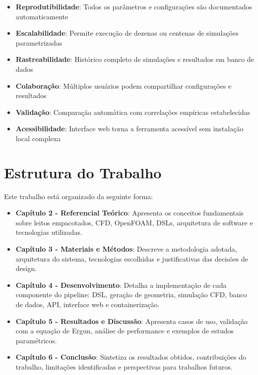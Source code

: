 \begin{itemize}
    \item \textbf{Reprodutibilidade}: Todos os parâmetros e configurações são documentados automaticamente
    \item \textbf{Escalabilidade}: Permite execução de dezenas ou centenas de simulações parametrizadas
    \item \textbf{Rastreabilidade}: Histórico completo de simulações e resultados em banco de dados
    \item \textbf{Colaboração}: Múltiplos usuários podem compartilhar configurações e resultados
    \item \textbf{Validação}: Comparação automática com correlações empíricas estabelecidas
    \item \textbf{Acessibilidade}: Interface web torna a ferramenta acessível sem instalação local complexa
\end{itemize}

\section{Estrutura do Trabalho}

Este trabalho está organizado da seguinte forma:

\begin{itemize}
    \item \textbf{Capítulo 2 - Referencial Teórico}: Apresenta os conceitos fundamentais sobre leitos empacotados, CFD, OpenFOAM, DSLs, arquitetura de software e tecnologias utilizadas.
    
    \item \textbf{Capítulo 3 - Materiais e Métodos}: Descreve a metodologia adotada, arquitetura do sistema, tecnologias escolhidas e justificativas das decisões de design.
    
    \item \textbf{Capítulo 4 - Desenvolvimento}: Detalha a implementação de cada componente do pipeline: DSL, geração de geometria, simulação CFD, banco de dados, API, interface web e containerização.
    
    \item \textbf{Capítulo 5 - Resultados e Discussão}: Apresenta casos de uso, validação com a equação de Ergun, análise de performance e exemplos de estudos paramétricos.
    
    \item \textbf{Capítulo 6 - Conclusão}: Sintetiza os resultados obtidos, contribuições do trabalho, limitações identificadas e perspectivas para trabalhos futuros.
\end{itemize}

